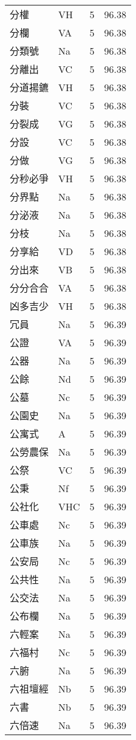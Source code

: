 \documentclass[twocolumn]{book}
\begin{document}
\begin{supertabular}{llrr}
分權 & VH & 5 &  96.38\\
分欄 & VA & 5 &  96.38\\
分類號 & Na & 5 &  96.38\\
分離出 & VC & 5 &  96.38\\
分道揚鑣 & VH & 5 &  96.38\\
分裝 & VC & 5 &  96.38\\
分裂成 & VG & 5 &  96.38\\
分設 & VC & 5 &  96.38\\
分做 & VG & 5 &  96.38\\
分秒必爭 & VH & 5 &  96.38\\
分界點 & Na & 5 &  96.38\\
分泌液 & Na & 5 &  96.38\\
分枝 & Na & 5 &  96.38\\
分享給 & VD & 5 &  96.38\\
分出來 & VB & 5 &  96.38\\
分分合合 & VA & 5 &  96.38\\
凶多吉少 & VH & 5 &  96.38\\
冗員 & Na & 5 &  96.39\\
公證 & VA & 5 &  96.39\\
公器 & Na & 5 &  96.39\\
公餘 & Nd & 5 &  96.39\\
公墓 & Nc & 5 &  96.39\\
公園史 & Na & 5 &  96.39\\
公寓式 & A & 5 &  96.39\\
公勞農保 & Na & 5 &  96.39\\
公祭 & VC & 5 &  96.39\\
公秉 & Nf & 5 &  96.39\\
公社化 & VHC & 5 &  96.39\\
公車處 & Nc & 5 &  96.39\\
公車族 & Na & 5 &  96.39\\
公安局 & Nc & 5 &  96.39\\
公共性 & Na & 5 &  96.39\\
公交法 & Na & 5 &  96.39\\
公布欄 & Na & 5 &  96.39\\
六輕案 & Na & 5 &  96.39\\
六福村 & Nc & 5 &  96.39\\
六腑 & Na & 5 &  96.39\\
六祖壇經 & Nb & 5 &  96.39\\
六書 & Nb & 5 &  96.39\\
六倍速 & Na & 5 &  96.39\\

\end{supertabular}
\end{document}
